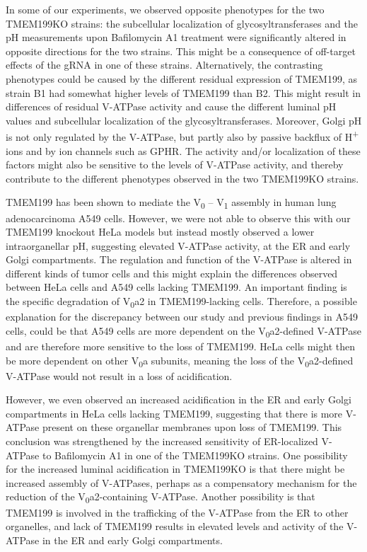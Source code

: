 In some of our experiments, we observed opposite phenotypes for the two TMEM199KO strains: the subcellular localization of glycosyltransferases and the pH measurements upon Bafilomycin A1 treatment were significantly altered in opposite directions for the two strains. This might be a consequence of off-target effects of the gRNA in one of these strains. Alternatively, the contrasting phenotypes could be caused by the different residual expression of TMEM199, as strain B1 had somewhat higher levels of TMEM199 than B2. This might result in differences of residual V-ATPase activity and cause the different luminal pH values and subcellular localization of the glycosyltransferases. Moreover, Golgi pH is not only regulated by the V-ATPase, but partly also by passive backflux of H\textsuperscript{+} ions and by ion channels such as GPHR\cite{maeda_gphr_2008}. The activity and/or localization of these factors might also be sensitive to the levels of V-ATPase activity, and thereby contribute to the different phenotypes observed in the two TMEM199KO strains.

TMEM199 has been shown to mediate the V\textsubscript{0} – V\textsubscript{1} assembly in human lung adenocarcinoma A549 cells\cite{li_genome-wide_2020}. However, we were not able to observe this with our TMEM199 knockout HeLa models but instead mostly observed a lower intraorganellar pH, suggesting elevated V-ATPase activity, at the ER and early Golgi compartments. The regulation and function of the V-ATPase is altered in different kinds of tumor cells\cite{stransky_function_2016} and this might explain the differences observed between HeLa cells and A549 cells lacking TMEM199. An important finding is the specific degradation of V\textsubscript{0}a2 in TMEM199-lacking cells. Therefore, a possible explanation for the discrepancy between our study and previous findings in A549 cells\cite{li_genome-wide_2020}, could be that A549 cells are more dependent on the V\textsubscript{0}a2-defined V-ATPase and are therefore more sensitive to the loss of TMEM199. HeLa cells might then be more dependent on other V\textsubscript{0}a subunits, meaning the loss of the V\textsubscript{0}a2-defined V-ATPase would not result in a loss of acidification.

However, we even observed an increased acidification in the ER and early Golgi compartments in HeLa cells lacking TMEM199, suggesting that there is more V-ATPase present on these organellar membranes upon loss of TMEM199. This conclusion was strengthened by the increased sensitivity of ER-localized V-ATPase to Bafilomycin A1 in one of the TMEM199KO strains. One possibility for the increased luminal acidification in TMEM199KO is that there might be increased assembly of V-ATPases, perhaps as a compensatory mechanism for the reduction of the V\textsubscript{0}a2-containing V-ATPase. Another possibility is that TMEM199 is involved in the trafficking of the V-ATPase from the ER to other organelles, and lack of TMEM199 results in elevated levels and activity of the V-ATPase in the ER and early Golgi compartments.

